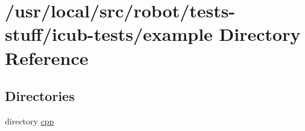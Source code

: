 \section{/usr/local/src/robot/tests-\/stuff/icub-\/tests/example Directory Reference}
\label{dir_cfc5e25795a93815c8704dea71aea0d5}
\subsection*{Directories}
\begin{DoxyCompactItemize}
\item 
directory \hyperlink{dir_b47ca12c4d837d43adfb2f92150f42b2}{cpp}
\end{DoxyCompactItemize}
